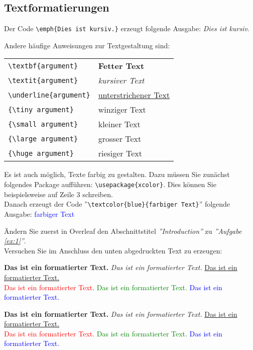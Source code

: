 \newpage
\subsection{Textformatierungen}
Der Code \verb|\emph{Dies ist kursiv.}| erzeugt folgende Ausgabe: \emph{Dies ist kursiv}.

\vspace{2mm}
\noindent Andere häufige Anweisungen zur Textgestaltung sind:

\vspace{4mm}
\begin{tabular}{ll}
\verb|\textbf{argument}| & \textbf{Fetter Text} \\
\verb|\textit{argument}| &  \textit{kursiver Text} \\
\verb|\underline{argument}| &  \underline{unterstrichener Text} \\
\verb|{\tiny argument}| & \tiny{winziger Text} \\
\verb|{\small argument}| & {\small kleiner Text} \\ 
\verb|{\large argument}| & {\large grosser Text} \\
\verb|{\huge argument}| & {\huge riesiger Text}
\end{tabular}

\vspace{4mm}
\noindent Es ist auch möglich, Texte farbig zu gestalten. Dazu müssen Sie zunächst folgendes Package aufführen: \verb|\usepackage{xcolor}|. Dies können Sie beispielsweise auf Zeile 3 schreiben.\\
 Danach erzeugt der Code ''\verb|\textcolor{blue}{farbiger Text}|''  folgende Ausgabe: \textcolor{blue}{farbiger Text}

\vspace{4mm}
\begin{ex} \label{ex:1}
Ändern Sie zuerst in Overleaf den Abschnittstitel \emph{''Introduction''} zu \emph{''Aufgabe \ref{ex:1}''}.\\
Versuchen Sie im Anschluss den unten abgedruckten Text zu erzeugen:
\end{ex}

\vspace{2mm}
\noindent \textbf{Das ist ein formatierter Text.} \emph{Das ist ein formatierter Text.} \underline{Das ist ein formatierter Text.}\\
\textcolor{red}{Das ist ein formatierter Text.} \textcolor{green}{Das ist ein formatierter Text.} \textcolor{blue}{Das ist ein formatierter Text.}\\

\vspace{1cm}
\noindent \textbf{Das ist ein formatierter Text.} \emph{Das ist ein formatierter Text.} \underline{Das ist ein formatierter Text.}\\
\textcolor{red}{Das ist ein formatierter Text.} \textcolor{green}{Das ist ein formatierter Text.} \textcolor{blue}{Das ist ein formatierter Text.}\\

